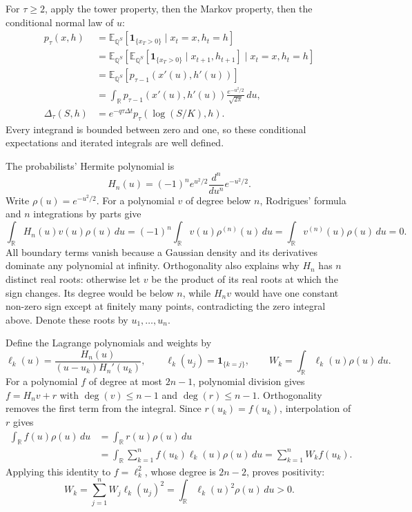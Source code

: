 \documentclass[11pt,a4paper]{article}
\newcommand{\E}{\mathbb E}
\newcommand{\Q}{\mathbb Q}
\newcommand{\ind}{\mathbf 1}
\newcommand{\dt}{\Delta t}
\theoremstyle{remark}
\begin{document}
For $\tau\geq2$, apply the tower property, then the Markov property, then the conditional normal law of $u$:
\begin{align}
 p_\tau(x,h)
 &=\E_{\Q^S}[\ind_{\{x_T>0\}}\mid x_t=x,h_t=h]\nonumber\\
 &=\E_{\Q^S}\!\left[
     \E_{\Q^S}[\ind_{\{x_T>0\}}\mid x_{t+1},h_{t+1}]
       \mid x_t=x,h_t=h\right]\nonumber\\
 &=\E_{\Q^S}[p_{\tau-1}(x'(u),h'(u))]\nonumber\\
 &=\int_{\mathbb R}p_{\tau-1}(x'(u),h'(u))
       \frac{e^{-u^2/2}}{\sqrt{2\pi}}\,du,\nonumber\\
 \Delta_\tau(S,h)&=e^{-q\tau\dt}p_\tau(\log(S/K),h).
 \label{eq:backward}
\end{align}
Every integrand is bounded between zero and one, so these conditional expectations and iterated integrals are well defined.

The probabilists' Hermite polynomial is
\begin{equation}
 H_n(u)=(-1)^ne^{u^2/2}\frac{d^n}{du^n}e^{-u^2/2}.
\end{equation}
Write $\rho(u)=e^{-u^2/2}$. For a polynomial $v$ of degree below $n$, Rodrigues' formula and $n$ integrations by parts give
\begin{equation}
 \int_{\mathbb R}H_n(u)v(u)\rho(u)\,du
 =(-1)^n\int_{\mathbb R}v(u)\rho^{(n)}(u)\,du
 =\int_{\mathbb R}v^{(n)}(u)\rho(u)\,du=0.
\end{equation}
All boundary terms vanish because a Gaussian density and its derivatives dominate any polynomial at infinity. Orthogonality also explains why $H_n$ has $n$ distinct real roots: otherwise let $v$ be the product of its real roots at which the sign changes. Its degree would be below $n$, while $H_nv$ would have one constant non-zero sign except at finitely many points, contradicting the zero integral above. Denote these roots by $u_1,\ldots,u_n$.

Define the Lagrange polynomials and weights by
\begin{equation}
 \ell_k(u)=\frac{H_n(u)}{(u-u_k)H_n'(u_k)},\qquad
 \ell_k(u_j)=\ind_{\{k=j\}},\qquad
 W_k=\int_{\mathbb R}\ell_k(u)\rho(u)\,du.
\end{equation}
For a polynomial $f$ of degree at most $2n-1$, polynomial division gives $f=H_n v+r$ with $\deg(v)\leq n-1$ and $\deg(r)\leq n-1$. Orthogonality removes the first term from the integral. Since $r(u_k)=f(u_k)$, interpolation of $r$ gives
\begin{align}
 \int_{\mathbb R}f(u)\rho(u)\,du
 &=\int_{\mathbb R}r(u)\rho(u)\,du\nonumber\\
 &=\int_{\mathbb R}\sum_{k=1}^nf(u_k)\ell_k(u)\rho(u)\,du
 =\sum_{k=1}^nW_kf(u_k).
\end{align}
Applying this identity to $f=\ell_k^2$, whose degree is $2n-2$, proves positivity:
\begin{equation}
 W_k=\sum_{j=1}^nW_j\ell_k(u_j)^2
 =\int_{\mathbb R}\ell_k(u)^2\rho(u)\,du>0.
\end{equation}
\end{document}
